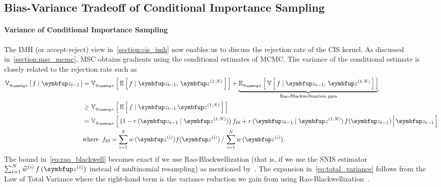 
\subsection{Bias-Variance Tradeoff of Conditional Importance Sampling}\label{section:bias_variance}
\paragraph{Variance of Conditional Importance Sampling}
The IMH (or accept-reject) view in~\cref{section:cis_imh} now enables us to discuss the rejection rate of the CIS kernel.
As discussed in~\cref{section:msc_mcmc}, MSC obtains gradients using the conditional estimates of MCMC.
The variance of the conditional estimate is closely related to the rejection rate such as
\begin{align}
  \Vsub{q_{\vlambda}}{f \mid \vz_{t-1}} 
  &=\Vsub{q_{\vlambda}}{ \E{ f \mid \vz_{t-1},\,\vz^{(1:N)} } } + \underbrace{\Esub{q_{\vlambda}}{ \V{ f \mid \vz_{t-1},\,\vz^{(1:N)} } }}_{\text{Rao-Blackwellization gain}} \label{eq:total_variance} \\
  &\geq \Vsub{q_{\vlambda}}{ \E{ f \mid \vz_{t-1}\,\vz^{(1:N)} } } \label{eq:rao_blackwell}\\
  &= \Vsub{q_{\vlambda}}{ \big(1 - r\,(\vz_{t-1}\mid\vz^{(1:N)})\big)\, f_{\mathrm{IS}}
    + r\,(\vz_{t-1}\mid\vz^{(1:N)})\,f(\vz_{t-1}) \,\middle\vert\, \vz_{t-1} } \label{eq:exact_variance} \\
  &\text{where}\;\; f_{\mathrm{IS}} = {\sum_{i=1}^N w\,(\vz^{(i)}) f(\vz^{(i)})\,/\,\sum_{i=1}^N w\,(\vz^{(i)})}. \nonumber 
\end{align}
%
The bound in~\eqref{eq:rao_blackwell} becomes exact if we use Rao-Blackwellization (that is, if we use the SNIS estimator \(\sum^{N}_{i=1} \widetilde{w}^{(i)}\,f\,(\vz^{(i)})\) instead of multinomial resampling) as mentioned by~\citet{NEURIPS2020_b2070693}.
The expansion in~\eqref{eq:total_variance} follows from the Law of Total Variance where the right-hand term is the variance reduction we gain from using Rao-Blackwellization~\citep{bernton_locally_2015}.

\vspace{-0.1in}
